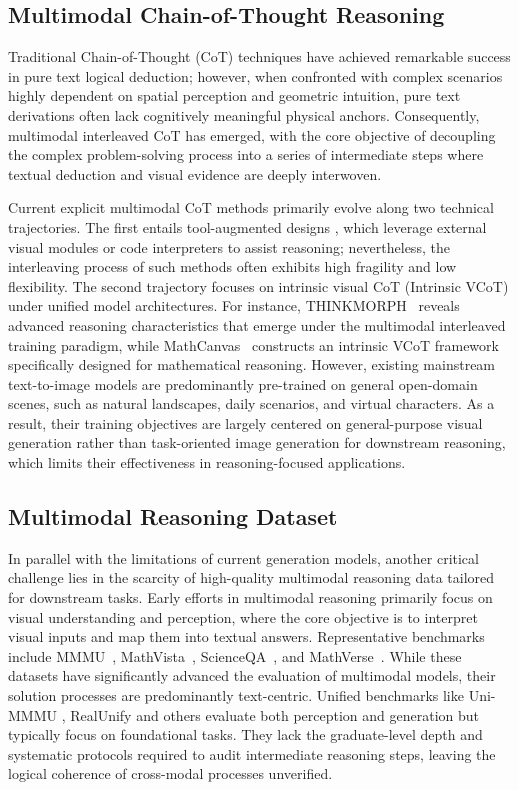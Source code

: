 \documentclass[11pt]{article}
\begin{document}
\subsection{Multimodal Chain-of-Thought Reasoning}

Traditional Chain-of-Thought (CoT) techniques have achieved remarkable success in pure text logical deduction; however, when confronted with complex scenarios highly dependent on spatial perception and geometric intuition, pure text derivations often lack cognitively meaningful physical anchors. Consequently, multimodal interleaved CoT has emerged, with the core objective of decoupling the complex problem-solving process into a series of intermediate steps where textual deduction and visual evidence are deeply interwoven.

Current explicit multimodal CoT methods primarily evolve along two technical trajectories. The first entails tool-augmented designs \cite{toolused1,toolused2,toolused3,toolused4,zhu-vtc,liyuying}, which leverage external visual modules or code interpreters to assist reasoning; nevertheless, the interleaving process of such methods often exhibits high fragility and low flexibility. The second trajectory focuses on intrinsic visual CoT (Intrinsic VCoT) under unified model architectures. For instance, THINKMORPH~\cite{thinkmorph} reveals advanced reasoning characteristics that emerge under the multimodal interleaved training paradigm, while MathCanvas~\cite{mathcanvas} constructs an intrinsic VCoT framework specifically designed for mathematical reasoning. However, existing mainstream text-to-image models are predominantly pre-trained on general open-domain scenes, such as natural landscapes, daily scenarios, and virtual characters. As a result, their training objectives are largely centered on general-purpose visual generation rather than task-oriented image generation for downstream reasoning, which limits their effectiveness in reasoning-focused applications.

\subsection{Multimodal Reasoning Dataset}

In parallel with the limitations of current generation models, another critical challenge lies in the scarcity of high-quality multimodal reasoning data tailored for downstream tasks. Early efforts in multimodal reasoning primarily focus on visual understanding and perception, where the core objective is to interpret visual inputs and map them into textual answers. Representative benchmarks include MMMU~\cite{mmmu}, MathVista~\cite{mathvista}, ScienceQA~\cite{scienceqa}, and MathVerse~\cite{mathverse}. While these datasets have significantly advanced the evaluation of multimodal models, their solution processes are predominantly text-centric. Unified benchmarks like Uni-MMMU \cite{uni-mmmu}, RealUnify \cite{realunify} and others \cite{quantifying,mmdeepresearch} evaluate both perception and generation but typically focus on foundational tasks. They lack the graduate-level depth and systematic protocols required to audit intermediate reasoning steps, leaving the logical coherence of cross-modal processes unverified.
\end{document}
